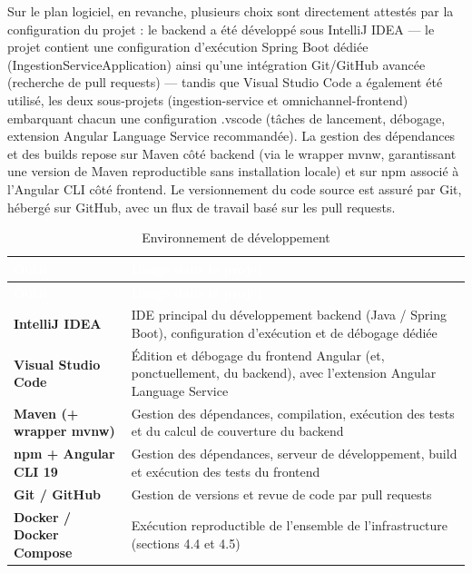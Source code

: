 \documentclass[12pt,a4paper]{report}
\begin{document}
Sur le plan logiciel, en revanche, plusieurs choix sont directement attestés par la configuration du projet : le backend a été développé sous IntelliJ IDEA --- le projet contient une configuration d'exécution Spring Boot dédiée (IngestionServiceApplication) ainsi qu'une intégration Git/GitHub avancée (recherche de pull requests) --- tandis que Visual Studio Code a également été utilisé, les deux sous-projets (ingestion-service et omnichannel-frontend) embarquant chacun une configuration .vscode (tâches de lancement, débogage, extension Angular Language Service recommandée). La gestion des dépendances et des builds repose sur Maven côté backend (via le wrapper mvnw, garantissant une version de Maven reproductible sans installation locale) et sur npm associé à l'Angular CLI côté frontend. Le versionnement du code source est assuré par Git, hébergé sur GitHub, avec un flux de travail basé sur les pull requests.

\begin{longtable}{@{}>{\raggedright\arraybackslash}p{}p{}@{}}
\caption{Environnement de développement}\\
\hline
\rowcolor{darkblue}\textcolor{white}{\textbf{Outil}} & \textcolor{white}{\textbf{Usage dans le projet}} \\
\hline
\endfirsthead
\hline
\rowcolor{darkblue}\textcolor{white}{\textbf{Outil}} & \textcolor{white}{\textbf{Usage dans le projet}} \\
\hline
\endhead
\hline
\endfoot
\textbf{IntelliJ IDEA} & IDE principal du développement backend (Java / Spring Boot), configuration d'exécution et de débogage dédiée \\
\hline
\textbf{Visual Studio Code} & Édition et débogage du frontend Angular (et, ponctuellement, du backend), avec l'extension Angular Language Service \\
\hline
\textbf{Maven (+ wrapper mvnw)} & Gestion des dépendances, compilation, exécution des tests et du calcul de couverture du backend \\
\hline
\textbf{npm + Angular CLI 19} & Gestion des dépendances, serveur de développement, build et exécution des tests du frontend \\
\hline
\textbf{Git / GitHub} & Gestion de versions et revue de code par pull requests \\
\hline
\textbf{Docker / Docker Compose} & Exécution reproductible de l'ensemble de l'infrastructure (sections 4.4 et 4.5) \\
\hline
\end{longtable}
\end{document}
